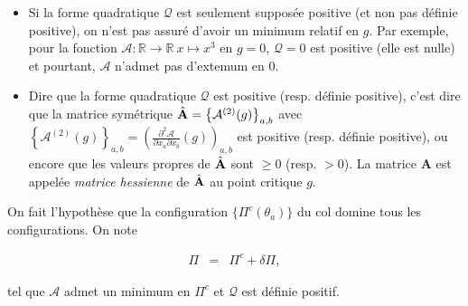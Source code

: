 \begin{Rema}
\begin{itemize}
	\item Si la forme quadratique $ \mathcal{Q}$ est seulement supposée positive (et non pas définie positive), on n'est pas assuré d'avoir un minimum relatif en $g$. Par exemple, pour la fonction $\mathcal{A} \colon \mathbb{R} \to \mathbb{R} ~x \mapsto x^3 $ en $g=0$, $\mathcal{Q} = 0 $ est positive (elle est nulle) et pourtant, $\mathcal{A}$ n'admet pas d'extemum en $0$.
	\item Dire que la forme quadratique $ \mathcal{Q}$ est positive (resp. définie positive), c'est dire que la matrice symétrique $\hat{\mathbf{A}} = \left \{ \mathcal{A}^{(2)} (g)\right \}_{a,b}$ avec  $\left \{ \mathcal{A}^{(2)} (g)\right \}_{a,b} = \left (\frac{\partial^2 \mathcal{A}}{\partial x_a \partial x_b}(g) \right )_{a,b}$ est positive (resp. définie positive), ou encore que les valeurs propres de $\hat{\mathbf{A}}$ sont $\geq 0$ (resp. $>0$). La matrice $\mathbf{A}$ est appelée {\em matrice hessienne} de $\hat{\mathbf{A}}$ au point critique $g$.\\
\end{itemize}
\end{Rema}

On fait l'hypothèse que la configuration $\{ \Pi^c(\theta_a) \}$ du col domine tous les configurations. On note %

\begin{eqnarray*}
	\Pi  & =  &\Pi^c + \delta \Pi,
\end{eqnarray*}

tel que $\mathcal{A}$  admet un minimum en $\Pi^c$ et $\mathcal{Q}$ est définie positif.







	
